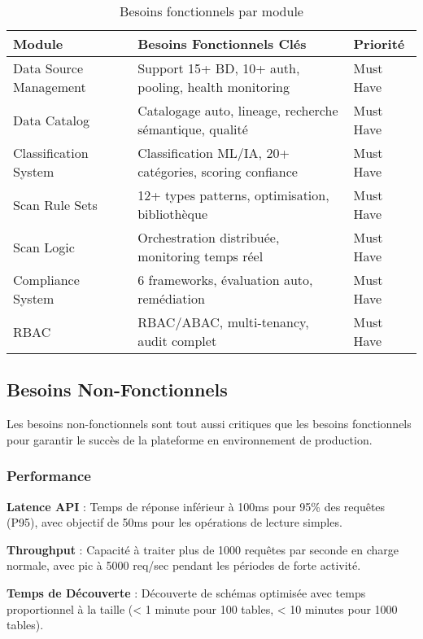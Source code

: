 \begin{table}[htpb]
\centering
\caption{Besoins fonctionnels par module}
\label{tab:besoins_fonctionnels}
\begin{tabular}{|p{}|p{}|p{}|}
\hline
\textbf{Module} & \textbf{Besoins Fonctionnels Clés} & \textbf{Priorité} \\
\hline
Data Source Management & Support 15+ BD, 10+ auth, pooling, health monitoring & Must Have \\
\hline
Data Catalog & Catalogage auto, lineage, recherche sémantique, qualité & Must Have \\
\hline
Classification System & Classification ML/IA, 20+ catégories, scoring confiance & Must Have \\
\hline
Scan Rule Sets & 12+ types patterns, optimisation, bibliothèque & Must Have \\
\hline
Scan Logic & Orchestration distribuée, monitoring temps réel & Must Have \\
\hline
Compliance System & 6 frameworks, évaluation auto, remédiation & Must Have \\
\hline
RBAC & RBAC/ABAC, multi-tenancy, audit complet & Must Have \\
\hline
\end{tabular}
\end{table}

\subsection{Besoins Non-Fonctionnels}

Les besoins non-fonctionnels sont tout aussi critiques que les besoins fonctionnels pour garantir le succès de la plateforme en environnement de production.

\subsubsection{Performance}

\textbf{Latence API} : Temps de réponse inférieur à 100ms pour 95\% des requêtes (P95), avec objectif de 50ms pour les opérations de lecture simples.

\textbf{Throughput} : Capacité à traiter plus de 1000 requêtes par seconde en charge normale, avec pic à 5000 req/sec pendant les périodes de forte activité.

\textbf{Temps de Découverte} : Découverte de schémas optimisée avec temps proportionnel à la taille (< 1 minute pour 100 tables, < 10 minutes pour 1000 tables).

